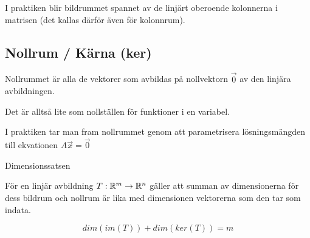 \documentclass[../main.tex]{subfiles}
\begin{document}
I praktiken blir bildrummet spannet av de linjärt oberoende kolonnerna i matrisen (det kallas därför även för kolonnrum).

\subsection{Nollrum / Kärna (ker)}
Nollrummet är alla de vektorer som avbildas på nollvektorn $\Vec{0}$ av den linjära avbildningen. 

Det är alltså lite som nollställen för funktioner i en variabel.

I praktiken tar man fram nollrummet genom att parametrisera lösningsmängden till ekvationen $A\Vec{x}=\vec{0}$

\begin{formel}{Dimensionssatsen}

För en linjär avbildning $T: \mathbb{R}^{m} \rightarrow \mathbb{R}^{n}$ gäller att summan av dimensionerna för dess bildrum och nollrum är lika med dimensionen vektorerna som den tar som indata.

$$dim(im(T)) + dim(ker(T)) = m$$
\end{formel}
\end{document}
